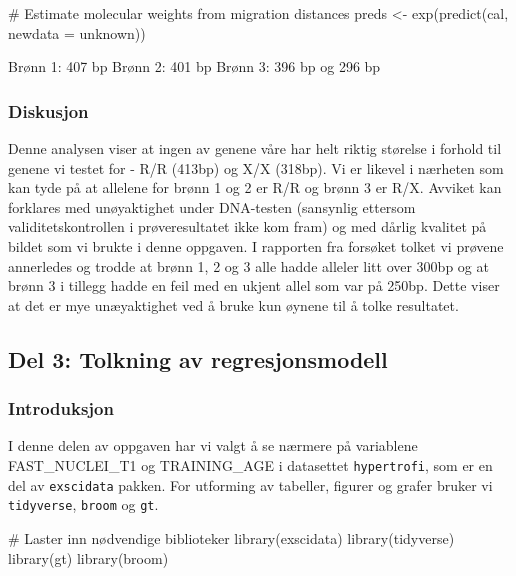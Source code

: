\documentclass[
  letterpaper,
  DIV=11,
  numbers=noendperiod]{scrartcl}
\newenvironment{Shaded}{\begin{snugshade}}{\end{snugshade}}
\newcommand{\AttributeTok}[1]{\textcolor[rgb]{0.40,0.45,0.13}{#1}}
\newcommand{\CommentTok}[1]{\textcolor[rgb]{0.37,0.37,0.37}{#1}}
\newcommand{\FunctionTok}[1]{\textcolor[rgb]{0.28,0.35,0.67}{#1}}
\newcommand{\NormalTok}[1]{\textcolor[rgb]{0.00,0.23,0.31}{#1}}
\newcommand{\OtherTok}[1]{\textcolor[rgb]{0.00,0.23,0.31}{#1}}
\begin{document}
\begin{Shaded}
\begin{Highlighting}[]
\CommentTok{\# Estimate molecular weights from migration distances}
\NormalTok{preds }\OtherTok{\textless{}{-}} \FunctionTok{exp}\NormalTok{(}\FunctionTok{predict}\NormalTok{(cal, }\AttributeTok{newdata =}\NormalTok{ unknown)) }
\end{Highlighting}
\end{Shaded}

Brønn 1: 407 bp Brønn 2: 401 bp Brønn 3: 396 bp og 296 bp

\subsubsection{Diskusjon}\label{diskusjon}

Denne analysen viser at ingen av genene våre har helt riktig størelse i
forhold til genene vi testet for - R/R (413bp) og X/X (318bp). Vi er
likevel i nærheten som kan tyde på at allelene for brønn 1 og 2 er R/R
og brønn 3 er R/X. Avviket kan forklares med unøyaktighet under
DNA-testen (sansynlig ettersom validitetskontrollen i prøveresultatet
ikke kom fram) og med dårlig kvalitet på bildet som vi brukte i denne
oppgaven. I rapporten fra forsøket tolket vi prøvene annerledes og
trodde at brønn 1, 2 og 3 alle hadde alleler litt over 300bp og at brønn
3 i tillegg hadde en feil med en ukjent allel som var på 250bp. Dette
viser at det er mye unæyaktighet ved å bruke kun øynene til å tolke
resultatet.

\subsection{Del 3: Tolkning av
regresjonsmodell}\label{del-3-tolkning-av-regresjonsmodell}

\subsubsection{Introduksjon}\label{introduksjon-2}

I denne delen av oppgaven har vi valgt å se nærmere på variablene
FAST\_NUCLEI\_T1 og TRAINING\_AGE i datasettet \texttt{hypertrofi}, som
er en del av \texttt{exscidata} pakken. For utforming av tabeller,
figurer og grafer bruker vi \texttt{tidyverse}, \texttt{broom} og
\texttt{gt}.

\begin{Shaded}
\begin{Highlighting}[]
\CommentTok{\# Laster inn nødvendige biblioteker}
\FunctionTok{library}\NormalTok{(exscidata)}
\FunctionTok{library}\NormalTok{(tidyverse)}
\FunctionTok{library}\NormalTok{(gt)}
\FunctionTok{library}\NormalTok{(broom)}
\end{Highlighting}
\end{Shaded}
\end{document}
